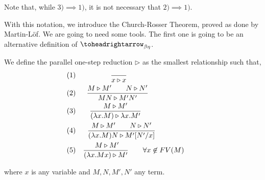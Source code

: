 \begin{remark} 
  Note that, while $3)\implies 1)$, it is not necessary that $2)\implies 1)$.
\end{remark}


With this notation, we introduce the Church-Rosser Theorem, proved as done by Martin-Löf. We are going to need some tools. The first one is going to be an alternative definition of $\toheadrightarrow_{\beta\eta}$.
\begin{definition}
  We define the parallel one-step reduction  $\triangleright$ as the smallest relationship such that,\\
\begin{align*}
(1)&& {\displaystyle \over x \triangleright x}\qquad\qquad\qquad\qquad\qquad\\
 (2)&& { M \triangleright M'\qquad N\triangleright N'  \over MN \triangleright M'N' }\qquad\qquad\qquad\ \  \ \\
 (3)&&{M \triangleright M' \over(\lambda x.M) \triangleright \lambda x.M'}\qquad\qquad\qquad\qquad\\
 (4)&& {M \triangleright M'\qquad N \triangleright N' \over (\lambda x.M)N \triangleright M'[N'/x]}\qquad\qquad\qquad\\
  (5)&& {\ M\triangleright M'\over(\lambda x.Mx) \triangleright M'} \qquad \forall x \not  \in FV(M)\qquad
\end{align*}



where $x$ is any variable and $M,N,M',N'$ any term.
\end{definition}

